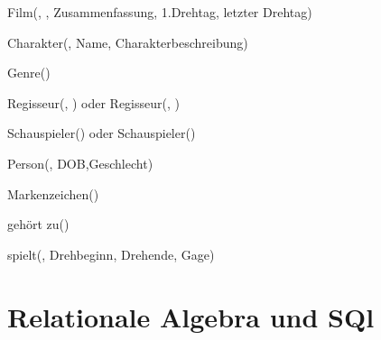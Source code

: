 \documentclass[ngerman]{gdb-aufgabenblatt}
\begin{document}
\begin{RMSchma}
Film(, , Zusammenfassung, 1.Drehtag, letzter Drehtag)

Charakter(, Name, Charakterbeschreibung)

Genre()

Regisseur(, ) oder Regisseur(, )

Schauspieler() oder Schauspieler()

Person(, DOB,Geschlecht)

Markenzeichen()

geh\"ort zu()

spielt(, Drehbeginn, Drehende, Gage)

\end{RMSchma}






\section{Relationale Algebra und SQl}
\end{document}
